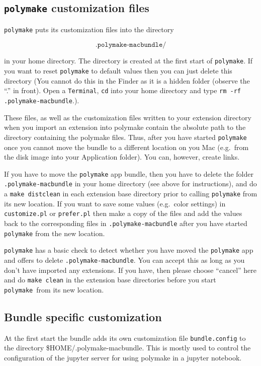 \documentclass[a4paper]{amsart}
\newcommand{\polymake}{\texttt{polymake}\xspace}
\begin{document}
\subsection*{\polymake customization files}

\polymake puts its customization files into the directory 

\[\texttt{.polymake-macbundle/} \]

in your home directory. The directory is created at the first start of \polymake. If you want to reset \polymake to default values then you can just delete this directory (You cannot do this in the Finder as it is a hidden folder (observe the ``.'' in front). Open a \texttt{Terminal}, \texttt{cd} into your home directory and type \texttt{rm -rf .polymake-macbundle}.).

These files, as well as the customization files written to your extension directory when you import an extension into polymake contain the absolute path to the directory containing the polymake files. Thus, after you have started \polymake once you cannot move the bundle to a different location on you Mac (e.g.\ from the disk image into your Application folder). You can, however, create links.

If you have to move the \polymake app bundle, then you have to delete the folder \texttt{.polymake-macbundle} in your home directory (see above for instructions), and do a \texttt{make distclean} in each extension base directory prior to calling \polymake from its new location. If you want to save some values (e.g.\ color settings) in \texttt{customize.pl} or \texttt{prefer.pl} then make a copy of the files and add the values back to the corresponding files in \texttt{.polymake-macbundle} after you have started \polymake from the new location.

\polymake has a basic check to detect whether you have moved the \polymake app and offers to delete \texttt{.polymake-macbundle}. You can accept this as long as you don't have imported any extensions. If you have, then please choose ``cancel'' here and do \texttt{make clean} in the extension base directories before you start \polymake\ from its new location.

\subsection*{Bundle specific customization}

At the first start the bundle adds its own customization file \texttt{bundle.config} to the directory {\$HOME/.polymake-macbundle}. This is mostly used to control the configuration of the jupyter server for using polymake in a jupyter notebook. 
\end{document}
